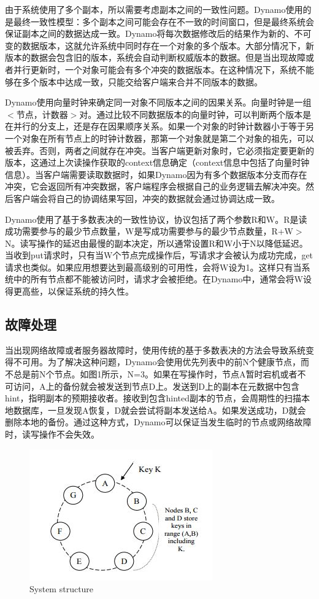 \documentclass[UTF8]{article}
\begin{document}
		由于系统使用了多个副本，所以需要考虑副本之间的一致性问题。Dynamo使用的是最终一致性模型：多个副本之间可能会存在不一致的时间窗口，但是最终系统会保证副本之间的数据达成一致。Dynamo将每次数据修改后的结果作为新的、不可变的数据版本，这就允许系统中同时存在一个对象的多个版本。大部分情况下，新版本的数据会包含旧的版本，系统会自动判断权威版本的数据。但是当出现故障或者并行更新时，一个对象可能会有多个冲突的数据版本。在这种情况下，系统不能够在多个版本中达成一致，只能交给客户端来合并不同版本的数据。

		Dynamo使用向量时钟来确定同一对象不同版本之间的因果关系。向量时钟是一组$<$节点，计数器$>$对。通过比较不同数据版本的向量时钟，可以判断两个版本是在并行的分支上，还是存在因果顺序关系。如果一个对象的时钟计数器小于等于另一个对象在所有节点上的时钟计数器，那第一个对象就是第二个对象的祖先，可以被丢弃。否则，两者之间就存在冲突。当客户端更新对象时，它必须指定要更新的版本，这通过上次读操作获取的context信息确定（context信息中包括了向量时钟信息）。当客户端需要读取数据时，如果Dynamo因为有多个数据版本分支而存在冲突，它会返回所有冲突数据，客户端程序会根据自己的业务逻辑去解决冲突。然后客户端会将自己的协调结果写回，冲突的数据就会通过协调达成一致。

		Dynamo使用了基于多数表决的一致性协议，协议包括了两个参数R和W。R是读成功需要参与的最少节点数量，W是写成功需要参与的最少节点数量，R+W$>$N。读写操作的延迟由最慢的副本决定，所以通常设置R和W小于N以降低延迟。当收到put请求时，只有当W个节点完成操作后，写请求才会被认为成功完成，get请求也类似。如果应用想要达到最高级别的可用性，会将W设为1。这样只有当系统中的所有节点都不能被访问时，请求才会被拒绝。在Dynamo中，通常会将W设得更高些，以保证系统的持久性。

	\subsection{故障处理}
		当出现网络故障或者服务器故障时，使用传统的基于多数表决的方法会导致系统变得不可用。为了解决这种问题，Dynamo会使用优先列表中的前N个健康节点，而不总是前N个节点。如图1所示，N=3。如果在写操作时，节点A暂时宕机或者不可访问，A上的备份就会被发送到节点D上。发送到D上的副本在元数据中包含hint，指明副本的预期接收者。接收到包含hinted副本的节点，会周期性的扫描本地数据库，一旦发现A恢复，D就会尝试将副本发送给A。如果发送成功，D就会删除本地的备份。通过这种方式，Dynamo可以保证当发生临时的节点或网络故障时，读写操作不会失效。
\begin{figure}[!h]
\centering
\small
\includegraphics{1.JPG}
\caption{System structure}
\end{figure}
		
\end{document}
